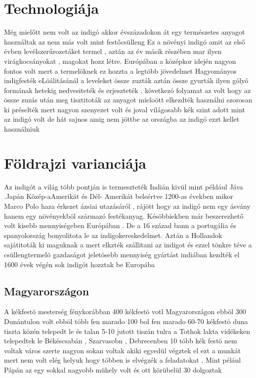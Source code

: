 \documentclass[fontsize=12pt, appendixprefix=true]{scrreprt}
\begin{document}
\section{Technologiája}
Még mielőtt nem volt az indigó akkor évszázadokon át egy természetes anyagot használtak az nem más volt mint festőcsülleng
Ez a növényi indigó  amit az első évben levélszerűrozetáket termel , aztán az év másik részében mar ilyen virágkocsányokat , magokat hozz létre.
Európában  a középkor idején nagyon fontos volt mert a termelöknek ez hozzta a legtöbb jövedelmet 
Hagyományos indigfesték	eLöálitásánál a leveleket össze zuzták aztán össze gyurták ilyen gólyó formának hetekig nedvesiteték és erjeszteték .
következö folyamat az volt hogy az össze zuzás után meg tisztitoták az anyagot mieloött elkezdték használni szorosan ki préselték mert nagyon szenyezet volt és joval világosabb kék szint adott mint az indigó volt de hát sajnos amig nem jöttbe az országba az indigó ezzt kellet használniuk


\section{Földrajzi varianciája}
Az indigót a világ több pontján is termeszteték  Indián kivül mint például Jáva .Japán Közép-aAmerikát és Dél- Amerikát beleértve 
1200-as években mikor Marco Polo haza érkezet ázsiai utazásáról , rájött hogy az indigó nem egy ásvány hanem egy növényekböl származó festékanyag.
Késöbbiekben már beszerezhető volt kisebb mennyiségeben Európában .
De a 16 század bann a portugália és spanyolország bonyolitota le az indigokereskedelmet.
Aztán a Hollandok sajátitoták ki maguknak a mert elkzték szállitani az indigot és ezzel tönkre téve a csüllengtermelö gazdaságot 
jeletösebb mennyiség gyártást indiában kezdték el 1600 évek végén sok indigót hozztak be Europába 



\subsection{Magyarországon}
A kékfestö mesterség fénykorábban 400 kékfestö votl Magyarországon ebböl 300 Dunántulon volt ebböl több fen marado 100 bol fen marado 60-70 kékfestö duna tiszta közén telepedt le és talan 5-10 jutott tiszán tulra a Tothok lakta vidékeken telepedtek  le Békéscsabán , Szarvasobn , Debrecenben 
10 több kék festö nem voltak város szerte 
nagyon sokan voltak akiki egyedül végztek el ezt a munkát mert nem volt elég helyuk hogy többen is elvégzék a feladatokat .
Mint pélául Pápán az egy sokkal nagyobb mühely volt és ott körübelül 30 dolgoztak 
\end{document}
